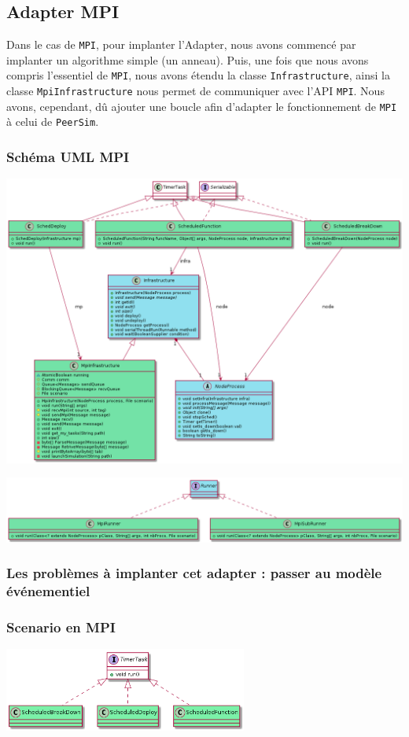 \documentclass{article}
\begin{document}
			\newpage
			\subsection{Adapter MPI}
			Dans le cas de \verb|MPI|, pour implanter l'Adapter, nous avons commencé par implanter un algorithme simple (un anneau). Puis, une fois que nous avons compris l'essentiel de \verb|MPI|, nous avons étendu la classe \verb|Infrastructure|, ainsi la classe \verb|MpiInfrastructure| nous permet de communiquer avec l'API \verb|MPI|. 
			Nous avons, cependant, dû ajouter une boucle afin d'adapter le fonctionnement de \verb|MPI| à celui de \verb|PeerSim|.
				\subsubsection{Schéma UML MPI}
				\vspace{1mm}
				\hspace*{-2.1cm} \includegraphics[width=19.5cm]{uml/mpi1.png}

				\hspace*{-2.3cm} \includegraphics[width=20cm]{uml/mpi2.png}
				\subsubsection{Les problèmes à implanter cet adapter : passer au modèle événementiel}
				\subsubsection{Scenario en MPI}
				\vspace{5mm}
				\hspace*{4cm} \includegraphics[width=80mm]{uml/scenMPIuml.png}
				
\end{document}
